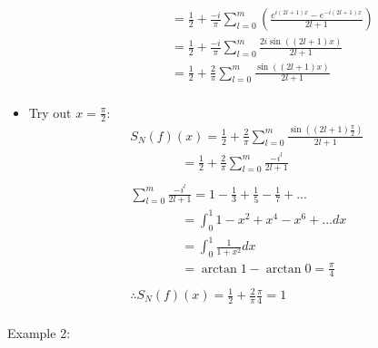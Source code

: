 \documentclass[12pt, a4paper]{article}
\begin{document}
\begin{itemize}
\begin{gather*}
        \qquad\qquad = \frac{1}{2}+\frac{-i}{\pi}\sum_{l=0}^m\left(\frac{e^{i(2l+1)x}-e^{-i(2l+1)x}}{2l+1}\right)\\
        \qquad\qquad = \frac{1}{2}+\frac{-i}{\pi}\sum_{l=0}^m\frac{2i\sin((2l+1)x)}{2l+1}\\
        \qquad\qquad = \frac{1}{2}+\frac{2}{\pi}\sum_{l=0}^m\frac{\sin((2l+1)x)}{2l+1}\\
    \end{gather*}
    \item Try out $x=\frac{\pi}{2}$:
    \begin{gather*}
        S_N(f)(x) = \frac{1}{2}+\frac{2}{\pi}\sum_{l=0}^m\frac{\sin((2l+1)\frac{\pi}{2})}{2l+1}\\
        \qquad\qquad = \frac{1}{2}+\frac{2}{\pi}\sum_{l=0}^m\frac{-i^l}{2l+1}\\\\
        \sum_{l=0}^m\frac{-i^l}{2l+1} = 1-\frac{1}{3}+\frac{1}{5}-\frac{1}{7}+...\\
        \qquad\qquad=\int_0^1 1-x^2+x^4-x^6+... dx\\
        \qquad\qquad=\int_0^1 \frac{1}{1+x^2}dx\\
        \qquad\qquad=\arctan 1-\arctan 0 = \frac{\pi}{4}\\\\
        \therefore  S_N(f)(x)=\frac{1}{2}+\frac{2}{\pi}\frac{\pi}{4} = 1\\
    \end{gather*}
\end{itemize}
Example 2:
\end{document}
